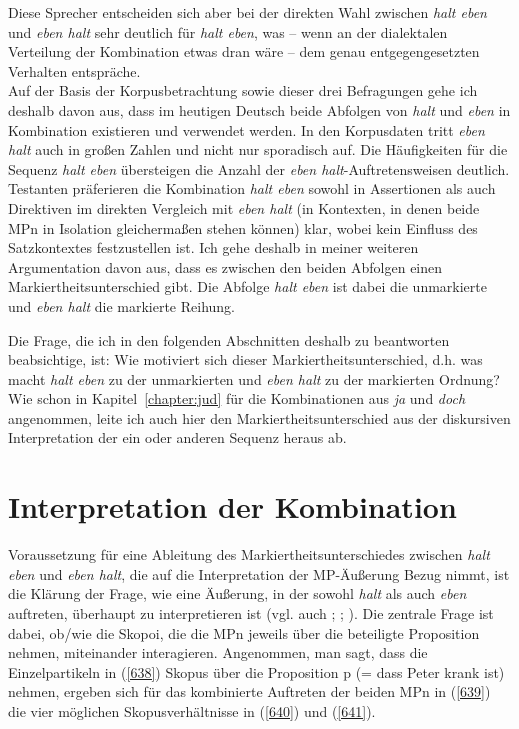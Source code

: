 Diese Sprecher entscheiden sich aber bei der direkten Wahl zwischen \textit{halt eben} und \textit{eben halt} sehr deutlich für \textit{halt eben}, was – wenn an der dialektalen Verteilung der Kombination etwas dran wäre – dem genau entgegengesetzten Verhalten entspräche.\\

\noindent
Auf der Basis der Korpusbetrachtung sowie dieser drei Befragungen gehe ich deshalb davon aus, dass im heutigen Deutsch beide Abfolgen von \textit{halt} und \textit{eben} in Kombination existieren und verwendet werden. In den Korpusdaten tritt \textit{eben halt} auch in großen Zahlen und nicht nur sporadisch auf. Die Häufigkeiten für die Sequenz \textit{halt eben} übersteigen die Anzahl der \textit{eben halt}-Auftretensweisen deutlich. Testanten präferieren die Kombination \textit{halt eben} sowohl in Assertionen als auch Direktiven im direkten Vergleich mit \textit{eben halt} (in Kontexten, in denen beide MPn in Isolation gleichermaßen stehen können) klar, wobei kein Einfluss des Satzkontextes festzustellen ist. Ich gehe deshalb in meiner weiteren Argumentation davon aus, dass es zwischen den beiden Abfolgen einen Markiertheits\-unterschied gibt. Die Abfolge \textit{halt eben} ist dabei die unmarkierte und \textit{eben halt} die markierte Reihung.

Die Frage, die ich in den folgenden Abschnitten deshalb zu beantworten beabsichtige, ist: Wie motiviert sich dieser Markiertheitsunterschied, d.h. was macht \textit{halt eben} zu der unmarkierten und \textit{eben halt} zu der markierten Ordnung? Wie schon in Kapitel~\ref{chapter:jud} für die Kombinationen aus \textit{ja} und \textit{doch} angenommen, leite ich auch hier den Markiertheitsunterschied aus der diskursiven Interpretation der ein oder anderen Sequenz heraus ab.

\section{Interpretation der Kombination}
\label{sec:interpretationkombi}
Voraussetzung für eine Ableitung des Markiertheitsunterschiedes zwischen \textit{halt eben} und \textit{eben halt}, die auf die Interpretation der MP-Äußerung Bezug nimmt, ist die Klärung der Frage, wie eine Äußerung, in der sowohl \textit{halt} als auch \textit{eben} auftreten, überhaupt zu interpretieren ist (vgl. auch \citealt[159-161]{Mueller2016a}; \citeyear[169-172]{Mueller2016b}; \citeyear[243-244]{Mueller2017a}). Die zentrale Frage ist dabei, ob/wie die Skopoi, die die MPn jeweils über die beteiligte Proposition nehmen, miteinander interagieren. Angenommen, man sagt, dass die Einzelpartikeln in (\ref{638}) Skopus über die Proposition p (= dass Peter krank ist) nehmen, ergeben sich für das kombinierte Auftreten der beiden MPn in (\ref{639}) die vier möglichen Skopusverhältnisse in (\ref{640}) und (\ref{641}).

